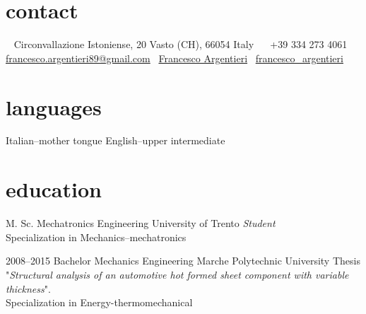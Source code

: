 \documentclass[]{friggeri-cv} %
\newcommand{\LinkedinColour}{{\color{linkedin} \faLinkedin}}
\newcommand{\Email}{{\color{black} \faEnvelope \,}}
\newcommand{\Skype}{{\color{skypeblue} \faSkype}}
\newcommand{\Phone}{{\color{phonegreen} \faPhone}}
\begin{document}


\begin{aside} %
\section{contact}
~
Circonvallazione Istoniense, 20
Vasto (CH), 66054
Italy
~
\Phone \, +39 334 273 4061
~
\Email \href{mailto:francesco.argentieri89@gmail.com}{francesco.argentieri89@gmail.com}
\LinkedinColour \, \href{https://it.linkedin.com/in/francesco-argentieri}{Francesco Argentieri}
\Skype \, \href{skype:my_username?add}{francesco\_argentieri}
\section{languages}
Italian--mother tongue
English--upper intermediate
\end{aside}


\section{education}

\begin{entrylist}


{M. Sc. {\normalfont Mechatronics Engineering}}
{University of Trento}
{\emph{Student}\\ Specialization in Mechanics--mechatronics}


\entry
{2008--2015}
{Bachelor {\normalfont Mechanics Engineering}}
{Marche Polytechnic University}
{Thesis "\emph{Structural analysis of an automotive hot formed sheet component with variable thickness}".\\
Specialization in Energy-thermomechanical}


\end{entrylist}
\end{document}
